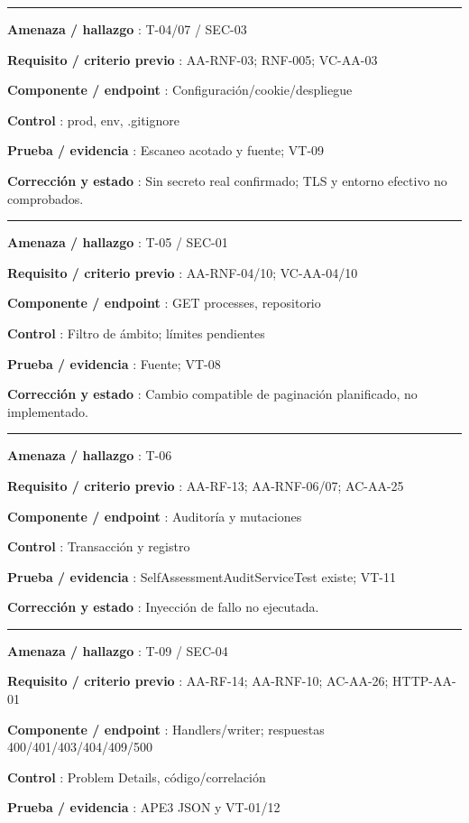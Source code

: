\documentclass[12pt,a4paper]{report}
\begin{document}
\medskip\hrule\medskip

\textbf{Amenaza / hallazgo }: T-04/07 / SEC-03

\textbf{Requisito / criterio previo }: AA-RNF-03; RNF-005; VC-AA-03

\textbf{Componente / endpoint }: Configuración/cookie/despliegue

\textbf{Control }: prod, env, .gitignore

\textbf{Prueba / evidencia }: Escaneo acotado y fuente; VT-09

\textbf{Corrección y estado }: Sin secreto real confirmado; TLS y
entorno efectivo no comprobados.

\medskip\hrule\medskip

\textbf{Amenaza / hallazgo }: T-05 / SEC-01

\textbf{Requisito / criterio previo }: AA-RNF-04/10; VC-AA-04/10

\textbf{Componente / endpoint }: GET processes, repositorio

\textbf{Control }: Filtro de ámbito; límites pendientes

\textbf{Prueba / evidencia }: Fuente; VT-08

\textbf{Corrección y estado }: Cambio compatible de paginación
planificado, no implementado.

\medskip\hrule\medskip

\textbf{Amenaza / hallazgo }: T-06

\textbf{Requisito / criterio previo }: AA-RF-13; AA-RNF-06/07; AC-AA-25

\textbf{Componente / endpoint }: Auditoría y mutaciones

\textbf{Control }: Transacción y registro

\textbf{Prueba / evidencia }: SelfAssessmentAuditServiceTest existe;
VT-11

\textbf{Corrección y estado }: Inyección de fallo no ejecutada.

\medskip\hrule\medskip

\textbf{Amenaza / hallazgo }: T-09 / SEC-04

\textbf{Requisito / criterio previo }: AA-RF-14; AA-RNF-10; AC-AA-26;
HTTP-AA-01

\textbf{Componente / endpoint }: Handlers/writer; respuestas
400/401/403/404/409/500

\textbf{Control }: Problem Details, código/correlación

\textbf{Prueba / evidencia }: APE3 JSON y VT-01/12
\end{document}
